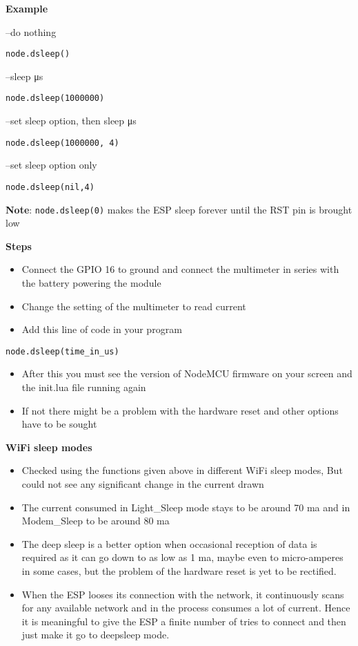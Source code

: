 \documentclass[16pt]{article}
\begin{document}
\textbf{Example}

--do nothing

\texttt{node.dsleep()}

--sleep μs

\texttt{node.dsleep(1000000)}

--set sleep option, then sleep μs

\texttt{node.dsleep(1000000, 4)}

--set sleep option only

\texttt{node.dsleep(nil,4)}

\textbf{Note}: \texttt{node.dsleep(0)} makes the ESP sleep forever until
the RST pin is brought low

\textbf{Steps}

\begin{itemize}

\item
  Connect the GPIO 16 to ground and connect the multimeter in series
  with the battery powering the module
\item
  Change the setting of the multimeter to read current
\item
  Add this line of code in your program
\end{itemize}

\texttt{node.dsleep(time\_in\_us)}

\begin{itemize}

\item
  After this you must see the version of NodeMCU firmware on your screen
  and the init.lua file running again
\item
  If not there might be a problem with the hardware reset and other
  options have to be sought
\end{itemize}

\textbf{WiFi sleep modes}

\begin{itemize}

\item
  Checked using the functions given above in different WiFi sleep modes,
  But could not see any significant change in the current drawn
\item
  The current consumed in Light\_Sleep mode stays to be around 70 ma and
  in Modem\_Sleep to be around 80 ma
\item
  The deep sleep is a better option when occasional reception of data is
  required as it can go down to as low as 1 ma, maybe even to
  micro-amperes in some cases, but the problem of the hardware reset is
  yet to be rectified.
\item
  When the ESP looses its connection with the network, it continuously
  scans for any available network and in the process consumes a lot of
  current. Hence it is meaningful to give the ESP a finite number of
  tries to connect and then just make it go to deepsleep mode.
\end{itemize}
\end{document}
